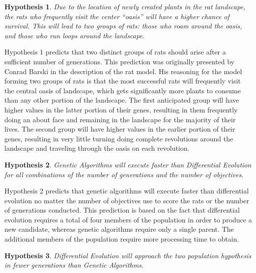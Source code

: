 \documentclass{sig-alternate}
\newtheorem{hyp}{Hypothesis}
\begin{document}
\begin{hyp}
\begin{minipage}[t]{2.2 in}
Due to the location of newly created plants in the rat landscape, the rats who frequently visit the center ``oasis'' will have a higher chance of survival.  This will lead to two groups of rats: those who roam around the oasis, and those who run loops around the landscape.
\end{minipage}
\end{hyp}

Hypothesis 1 predicts that two distinct groups of rats should arise after a sufficient number of generations.  This prediction was originally presented by Conrad Barski in the description of the rat model.\cite{LOL}  His reasoning for the model forming two groups of rats is that the most successful rats will frequently visit the central oasis of landscape, which gets significantly more plants to consume than any other portion of the landscape.  The first anticipated group will have higher values in the latter portion of their genes, resulting in them frequently doing an about face and remaining in the landscape for the majority of their lives.  The second group will have higher values in the earlier portion of their genes, resulting in very little turning doing complete revolutions around the landscape and traveling through the oasis on each revolution.

\begin{hyp}
\begin{minipage}[t]{2.2 in}
Genetic Algorithms will execute faster than Differential Evolution for all combinations of the number of generations and the number of objectives.
\end{minipage}
\end{hyp}

Hypothesis 2 predicts that genetic algorithms will execute faster than differential evolution no matter the number of objectives use to score the rats or the number of generations conducted.  This prediction is based on the fact that differential evolution requires a total of four members of the population in order to produce a new candidate\cite{Das:DE}, whereas genetic algorithms require only a single parent.  The additional members of the population require more processing time to obtain.

\begin{hyp}
\begin{minipage}[t]{2.2 in}
Differential Evolution will approach the two population hypothesis in fewer generations than Genetic Algorithms.
\end{minipage}
\end{hyp}
\end{document}
